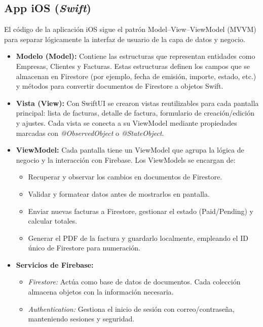 \subsection{App iOS (\textit{Swift})}

\begin{large}

El código de la aplicación iOS sigue el patrón Model–View–ViewModel (MVVM) para separar lógicamente la interfaz de usuario de la capa de datos y negocio. 
\begin{itemize}
  \item \textbf{Modelo (Model):} Contiene las estructuras que representan entidades como Empresas, Clientes y Facturas. Estas estructuras definen los campos que se almacenan en Firestore (por ejemplo, fecha de emisión, importe, estado, etc.) y métodos para convertir documentos de Firestore a objetos Swift.
  \item \textbf{Vista (View):} Con SwiftUI se crearon vistas reutilizables para cada pantalla principal: lista de facturas, detalle de factura, formulario de creación/edición y ajustes. Cada vista se conecta a su ViewModel mediante propiedades marcadas con \textit{@ObservedObject} o \textit{@StateObject}.
  \item \textbf{ViewModel:} Cada pantalla tiene un ViewModel que agrupa la lógica de negocio y la interacción con Firebase. Los ViewModels se encargan de:
    \begin{itemize}
      \item Recuperar y observar los cambios en documentos de Firestore.
      \item Validar y formatear datos antes de mostrarlos en pantalla.
      \item Enviar nuevas facturas a Firestore, gestionar el estado (Paid/Pending) y calcular totales.
      \item Generar el PDF de la factura y guardarlo localmente, empleando el ID único de Firestore para numeración.
    \end{itemize}
  \item \textbf{Servicios de Firebase:}  
    \begin{itemize}
      \item \textit{Firestore:} Actúa como base de datos de documentos. Cada colección almacena objetos con la información necesaria.
      \item \textit{Authentication:} Gestiona el inicio de sesión con correo/contraseña, manteniendo sesiones y seguridad.
    \end{itemize}
\end{itemize}

\end{large}

